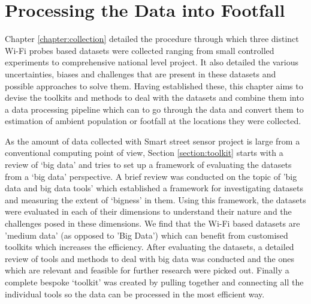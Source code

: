 \chapter{Processing the Data into Footfall} \label{chapter:processing}

Chapter \ref{chapter:collection} detailed the procedure through which three distinct Wi-Fi probes based datasets were collected ranging from small controlled experiments to comprehensive national level project.
It also detailed the various uncertainties, biases and challenges that are present in these datasets and possible approaches to solve them.
Having established these, this chapter aims to devise the toolkits and methods to deal with the datasets and combine them into a data processing pipeline which can to go through the data and convert them to estimation of ambient population or footfall at the locations they were collected.

As the amount of data collected with Smart street sensor project is large from a conventional computing point of view, Section \ref{section:toolkit} starts with a review of `big data' and tries to set up a framework of evaluating the datasets from a `big data' perspective.
A brief review was conducted on the topic of 'big data and big data tools' which established a framework for investigating datasets and measuring the extent of 
`bigness' in them.
Using this framework, the datasets were evaluated in each of their dimensions to understand their nature and the challenges posed in these dimensions.
We find that the Wi-Fi based datasets are 'medium data' (as opposed to 'Big Data') which can benefit from customised toolkits which increases the efficiency.
After evaluating the datasets, a detailed review of tools and methods to deal with big data was conducted and the ones which are relevant and feasible for further research were picked out.
Finally a complete bespoke `toolkit' was created by pulling together and connecting all the individual tools so the data can be processed in the most efficient way.

